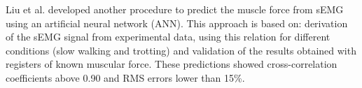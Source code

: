 \documentclass[letterpaper, 10 pt, conference]{ieeeconf}  %
\begin{document}
%
%
%
Liu et al. \cite{Liu1999391} developed another procedure to predict the muscle force from sEMG using an artificial neural network (ANN). This approach is based on: derivation of the sEMG signal from experimental data, using this relation for different conditions (slow walking and trotting) and validation of the results obtained with registers of known muscular force. These predictions showed cross-correlation coefficients above 0.90 and RMS errors lower than 15\%.
%
%
% 
% 
% 
% 
% 
% 
% 
\end{document}
